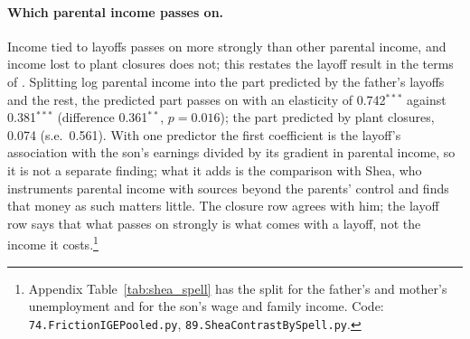 \paragraph{Which parental income passes on.} Income tied to layoffs passes on more strongly than other parental
income, and income lost to plant closures does not; this restates the layoff result in the terms of
\citet{shea2000does}. Splitting log parental income into the part predicted by the father's layoffs and the rest, the
predicted part passes on with an elasticity of 0.742$^{***}$ against 0.381$^{***}$ (difference 0.361$^{**}$, $p =
0.016$); the part predicted by plant closures, 0.074 (s.e.\ 0.561). With one predictor the first coefficient is the
layoff's association with the son's earnings divided by its gradient in parental income, so it is not a separate
finding; what it adds is the comparison with Shea, who instruments parental income with sources beyond the parents'
control and finds that money as such matters little. The closure row agrees with him; the layoff row says that what
passes on strongly is what comes with a layoff, not the income it costs.\footnote{Appendix Table~\ref{tab:shea_spell}
has the split for the father's and mother's unemployment and for the son's wage and family income. Code:
\texttt{74.FrictionIGEPooled.py}, \texttt{89.SheaContrastBySpell.py}.}




